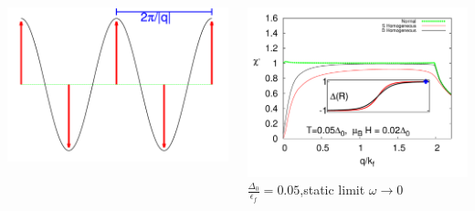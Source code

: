 \documentclass[amssymb,amsmath]{beamer}
\begin{document}
\begin{frame}
\begin{columns}
\begin{column}{0.42\textwidth}
\includegraphics[scale=0.14]{./figures/q_diag.png}
\end{column}
\begin{column}{0.6\textwidth}
\centering
\includegraphics[scale=0.22]{./figures_3/fig_4/Fig4_1.png}\\
$\frac{\Delta_0}{\epsilon_f} = 0.05$,\quad static limit $\omega \rightarrow 0$
\end{column}
\end{columns}
\end{frame}
\end{document}
